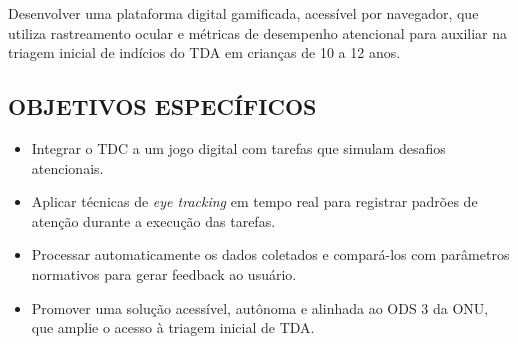 Desenvolver uma plataforma digital gamificada, acessível por navegador, que utiliza
rastreamento ocular e métricas de desempenho atencional para auxiliar na triagem inicial de
indícios do TDA em crianças de 10 a 12 anos.

\subsection*{OBJETIVOS ESPECÍFICOS} 

\begin{itemize}
    \item Integrar o TDC a um jogo digital com tarefas que
    simulam desafios atencionais.
    \item  Aplicar técnicas de \textit{eye tracking} em tempo real para registrar padrões de
    atenção durante a execução das tarefas.
    \item Processar automaticamente os dados coletados e compará-los com parâmetros
    normativos para gerar feedback ao usuário.
    \item Promover uma solução acessível, autônoma e alinhada ao ODS 3 da ONU, que amplie
    o acesso à triagem inicial de TDA.
\end{itemize}
